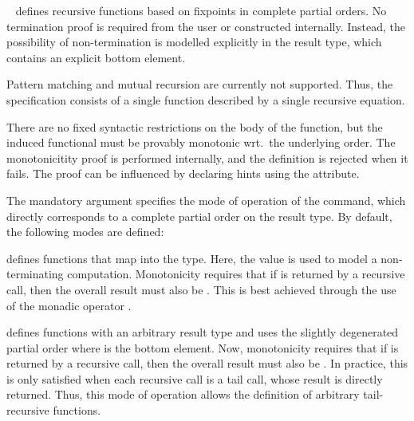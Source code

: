 \begin{isabellebody}
\begin{isamarkuptext}
  \begin{description}

  \item \hyperlink{command.HOL.partial-function}{\mbox{}}~ defines
  recursive functions based on fixpoints in complete partial
  orders. No termination proof is required from the user or
  constructed internally. Instead, the possibility of non-termination
  is modelled explicitly in the result type, which contains an
  explicit bottom element.

  Pattern matching and mutual recursion are currently not supported.
  Thus, the specification consists of a single function described by a
  single recursive equation.

  There are no fixed syntactic restrictions on the body of the
  function, but the induced functional must be provably monotonic
  wrt.\ the underlying order.  The monotonicitity proof is performed
  internally, and the definition is rejected when it fails. The proof
  can be influenced by declaring hints using the
  \hyperlink{attribute.HOL.partial-function-mono}{\mbox{}} attribute.

  The mandatory  argument specifies the mode of operation
  of the command, which directly corresponds to a complete partial
  order on the result type. By default, the following modes are
  defined:

  \begin{description}
  \item {} defines functions that map into the  type. Here, the value  is used to model a
  non-terminating computation. Monotonicity requires that if  is returned by a recursive call, then the overall result
  must also be . This is best achieved through the use of
  the monadic operator .

  \item {} defines functions with an arbitrary result
  type and uses the slightly degenerated partial order where  is the bottom element.  Now, monotonicity requires that
  if  is returned by a recursive call, then the
  overall result must also be . In practice, this is
  only satisfied when each recursive call is a tail call, whose result
  is directly returned. Thus, this mode of operation allows the
  definition of arbitrary tail-recursive functions.
  \end{description}


\end{description}
\end{isamarkuptext}
\end{isabellebody}
